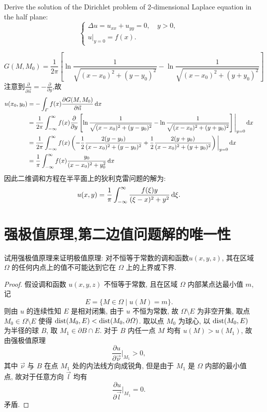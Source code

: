\begin{exercise}
  Derive the solution of the Dirichlet problem of 2-dimensional Laplace
  equation in the half plane:
  \[\begin{cases}
    \Delta u = u_{xx} + u_{yy} = 0, \quad y>0, \\
    u|_{y=0} = f(x).
  \end{cases}\]
\end{exercise}

\begin{solve}
  \[G(M,M_0)=\frac{1}{2\pi}\left[\ln\frac{1}{\sqrt{(x-x_0)^2+(y-y_0)^2}}-\ln\frac{1}{\sqrt{(x-x_0)^2+(y+y_0)^2}}\right]\]
  注意到$\frac{\partial}{\partial\vec{n}}=-\frac{\partial}{\partial y}$,故
  \[\begin{split}
  u(x_0,y_0)&=-\int_{\varGamma}f(x)\frac{\partial G(M,M_0)}{\partial\vec{n}}\mathop{}\!\mathrm{d} x\\
  &=\frac{1}{2\pi}\int_{-\infty}^{\infty}f(x)\frac{\partial}{\partial y}\left[\ln\frac{1}{\sqrt{(x-x_0)^2+(y-y_0)^2}}-\ln\frac{1}{\sqrt{(x-x_0)^2+(y+y_0)^2}}\right]\Bigg|_{y=0}\mathop{}\!\mathrm{d} x\\
  &=\frac{1}{2\pi}\int_{-\infty}^{\infty}f(x)\left(-\frac{1}{2}\frac{2(y-y_0)}{(x-x_0)^2+(y-y_0)^2}+\frac{1}{2}\frac{2(y+y_0)}{(x-x_0)^2+(y+y_0)^2}\right)\bigg|_{y=0}\mathop{}\!\mathrm{d} x\\
  &=\frac{1}{\pi}\int_{-\infty}^{\infty}f(x)\frac{y_0}{(x-x_0)^2+y_0^2}\mathop{}\!\mathrm{d} x
  \end{split}\]
  因此二维调和方程在半平面上的狄利克雷问题的解为:
  \[u(x,y)=\frac{1}{\pi}\int_{-\infty}^{\infty}\frac{f(\xi)y}{(\xi-x)^2+y^2}\mathop{}\!\mathrm{d}\xi. \qedhere\]
\end{solve}


\section{强极值原理,第二边值问题解的唯一性}

\begin{exercise}
  试用强极值原理来证明极值原理: 对不恒等于常数的调和函数$u(x,y,z)$,
  其在区域 $\varOmega$ 的任何内点上的值不可能达到它在 $\varOmega$ 上的上界或下界.
\end{exercise}

\begin{proof}
  假设调和函数 $u(x,y,z)$ 不恒等于常数, 且在区域 $\varOmega$ 内部某点达最小值 $m$, 记
  \[E = \{ M\in\varOmega \mid u(M) = m\}.\]
  则由 $u$ 的连续性知 $E$ 是相对闭集, 由于 $u$ 不恒为常数, 故 $\varOmega\setminus E$ 为非空开集,
  取点 $M_0\in\varOmega\setminus E$ 使得 $\operatorname{dist}(M_0, E) < \operatorname{dist}(M_0, \partial\varOmega)$.
  取以点 $M_0$ 为球心, 以 $\operatorname{dist}(M_0, E)$ 为半径的球 $B$, 取 $M_1\in \partial B\cap E$.
  对于 $B$ 内任一点 $M$ 均有 $u(M)>u(M_1)$, 故由强极值原理
  \[\frac{\partial u}{\partial\vec{\nu}}\bigg|_{M_1} > 0,\]
  其中 $\vec{\nu}$ 与 $B$ 在点 $M_1$ 处的内法线方向成锐角,
  但是由于 $M_1$ 是 $\varOmega$ 内部的最小值点, 故对于任意方向 $\vec{l}$ 均有
  \[\frac{\partial u}{\partial\vec{l}}\bigg|_{M_1} = 0.\]
  矛盾.
\end{proof}


